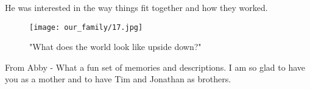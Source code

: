 He was interested in the way things fit together and how they worked.
\begin{figure}
\centering
\texttt{[image: our\_family/17.jpg]}
\caption{
"What does the world look like upside down?"
}
\end{figure}

From Abby - What a fun set of memories and descriptions.
I am so glad to have you as a mother and to have Tim and Jonathan as brothers.





